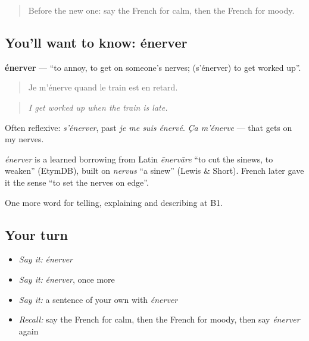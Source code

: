 \begin{quote}
Before the new one: say the French for calm, then the French for moody.
\end{quote}

\subsection*{You'll want to know: énerver}
\textbf{énerver} — \textquotedblleft{}to annoy, to get on someone's nerves; (s'énerver) to get worked up\textquotedblright{}.

\begin{quote}
Je m'énerve quand le train est en retard.
\end{quote}

\begin{quote}
\emph{I get worked up when the train is late.}
\end{quote}

Often reflexive: \emph{s'énerver}, past \emph{je me suis énervé}. \emph{Ça m'énerve} — that gets on my nerves.

\begin{cousinweb}
\emph{énerver} is a learned borrowing from Latin \emph{ēnervāre} \textquotedblleft{}to cut the sinews, to weaken\textquotedblright{} (EtymDB), built on \emph{nervus} \textquotedblleft{}a sinew\textquotedblright{} (Lewis \& Short). French later gave it the sense \textquotedblleft{}to set the nerves on edge\textquotedblright{}.
\end{cousinweb}

\begin{grammarlens}[title={What you've built}]
One more word for telling, explaining and describing at B1.
\end{grammarlens}

\subsection*{Your turn}
\begin{itemize}
\raggedright
  \item \emph{Say it:} \emph{énerver}
  \item \emph{Say it:} \emph{énerver}, once more
  \item \emph{Say it:} a sentence of your own with \emph{énerver}
  \item \emph{Recall:} say the French for calm, then the French for moody, then say \emph{énerver} again
\end{itemize}

